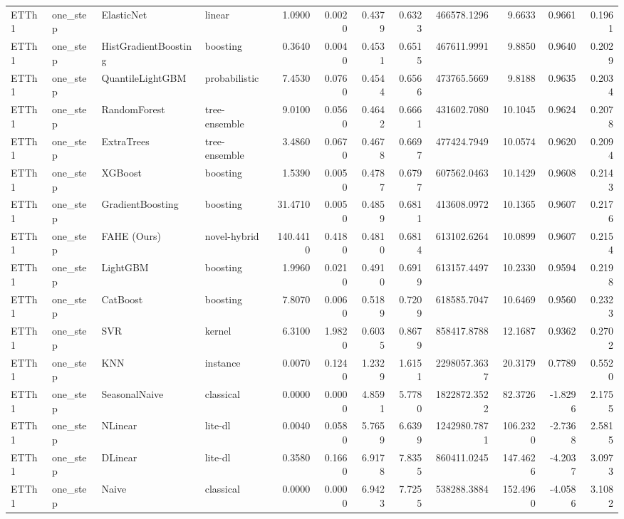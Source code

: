 \begin{tabular}{llllrrrrrrrr}
ETTh1 & one_step & ElasticNet & linear & 1.0900 & 0.0020 & 0.4379 & 0.6323 & 466578.1296 & 9.6633 & 0.9661 & 0.1961 \\
ETTh1 & one_step & HistGradientBoosting & boosting & 0.3640 & 0.0040 & 0.4531 & 0.6515 & 467611.9991 & 9.8850 & 0.9640 & 0.2029 \\
ETTh1 & one_step & QuantileLightGBM & probabilistic & 7.4530 & 0.0760 & 0.4544 & 0.6566 & 473765.5669 & 9.8188 & 0.9635 & 0.2034 \\
ETTh1 & one_step & RandomForest & tree-ensemble & 9.0100 & 0.0560 & 0.4642 & 0.6661 & 431602.7080 & 10.1045 & 0.9624 & 0.2078 \\
ETTh1 & one_step & ExtraTrees & tree-ensemble & 3.4860 & 0.0670 & 0.4678 & 0.6697 & 477424.7949 & 10.0574 & 0.9620 & 0.2094 \\
ETTh1 & one_step & XGBoost & boosting & 1.5390 & 0.0050 & 0.4787 & 0.6797 & 607562.0463 & 10.1429 & 0.9608 & 0.2143 \\
ETTh1 & one_step & GradientBoosting & boosting & 31.4710 & 0.0050 & 0.4859 & 0.6811 & 413608.0972 & 10.1365 & 0.9607 & 0.2176 \\
ETTh1 & one_step & FAHE (Ours) & novel-hybrid & 140.4410 & 0.4180 & 0.4810 & 0.6814 & 613102.6264 & 10.0899 & 0.9607 & 0.2154 \\
ETTh1 & one_step & LightGBM & boosting & 1.9960 & 0.0210 & 0.4910 & 0.6919 & 613157.4497 & 10.2330 & 0.9594 & 0.2198 \\
ETTh1 & one_step & CatBoost & boosting & 7.8070 & 0.0060 & 0.5189 & 0.7209 & 618585.7047 & 10.6469 & 0.9560 & 0.2323 \\
ETTh1 & one_step & SVR & kernel & 6.3100 & 1.9820 & 0.6035 & 0.8679 & 858417.8788 & 12.1687 & 0.9362 & 0.2702 \\
ETTh1 & one_step & KNN & instance & 0.0070 & 0.1240 & 1.2329 & 1.6151 & 2298057.3637 & 20.3179 & 0.7789 & 0.5520 \\
ETTh1 & one_step & SeasonalNaive & classical & 0.0000 & 0.0000 & 4.8591 & 5.7780 & 1822872.3522 & 82.3726 & -1.8296 & 2.1755 \\
ETTh1 & one_step & NLinear & lite-dl & 0.0040 & 0.0580 & 5.7659 & 6.6399 & 1242980.7871 & 106.2320 & -2.7368 & 2.5815 \\
ETTh1 & one_step & DLinear & lite-dl & 0.3580 & 0.1660 & 6.9178 & 7.8355 & 860411.0245 & 147.4626 & -4.2037 & 3.0973 \\
ETTh1 & one_step & Naive & classical & 0.0000 & 0.0000 & 6.9423 & 7.7255 & 538288.3884 & 152.4960 & -4.0586 & 3.1082 \\

\end{tabular}
